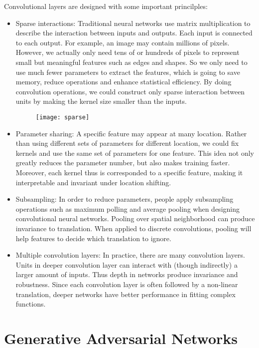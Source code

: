 Convolutional layers are designed with some important princilples: 
\begin{itemize}
\item Sparse interactions: Traditional neural networks use matrix multiplication to describe the interaction between inputs and outputs. Each input is connected to each output. For example, an image may contain millions of pixels. However, we actually only need tens of or hundreds of pixels to represent small but meaningful features such as edges and shapes. So we only need to use much fewer parameters to extract the features, which is going to save memory, reduce operations and enhance statistical efficiency. By doing convolution operations, we could construct only sparse interaction between units by making the kernel size smaller than the inputs.
\begin{figure}
	\centering
	\texttt{[image: sparse]}
	\label{fig:5}
\end{figure}
\item Parameter sharing: A specific feature may appear at many location. Rather than using different sets of parameters for different location, we could fix kernels and use the same set of parameters for one feature. This idea not only greatly reduces the parameter number, but also makes training faster. Moreover, each kernel thus is corresponded to a specific feature, making it interpretable and invariant under location shifting.

\item Subsampling: In order to reduce parameters, people apply subsampling operations such as maximum polling and average pooling when designing convolutional neural networks. Pooling over spatial neighborhood can produce invariance to translation. When applied to discrete convolutions, pooling will help features to decide which translation to ignore.

\item Multiple convolution layers: In practice, there are many convolution layers. Units in deeper convolution layer can interact with (though indirectly) a larger amount of inputs. Thus depth in networks produce invariance and robustness. Since each convolution layer is often followed by a non-linear translation, deeper networks have better performance in fitting complex functions.
\end{itemize}

\section{Generative Adversarial Networks}

